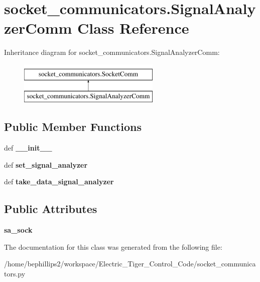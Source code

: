 \hypertarget{classsocket__communicators_1_1_signal_analyzer_comm}{\section{socket\-\_\-communicators.\-Signal\-Analyzer\-Comm Class Reference}
\label{classsocket__communicators_1_1_signal_analyzer_comm}
}
Inheritance diagram for socket\-\_\-communicators.\-Signal\-Analyzer\-Comm\-:\begin{figure}[H]
\begin{center}
\leavevmode
\includegraphics[height=2.000000cm]{classsocket__communicators_1_1_signal_analyzer_comm}
\end{center}
\end{figure}
\subsection*{Public Member Functions}
\begin{DoxyCompactItemize}
\item 
\hypertarget{classsocket__communicators_1_1_signal_analyzer_comm_a5e49fc639a0758b10017c0c4aeb9f905}{def {\bfseries \-\_\-\-\_\-init\-\_\-\-\_\-}}\label{classsocket__communicators_1_1_signal_analyzer_comm_a5e49fc639a0758b10017c0c4aeb9f905}

\item 
\hypertarget{classsocket__communicators_1_1_signal_analyzer_comm_a6126c357f3bed64a3504e52b79569ef2}{def {\bfseries set\-\_\-signal\-\_\-analyzer}}\label{classsocket__communicators_1_1_signal_analyzer_comm_a6126c357f3bed64a3504e52b79569ef2}

\item 
\hypertarget{classsocket__communicators_1_1_signal_analyzer_comm_a8320f6ea3a275618151f15f2416982e7}{def {\bfseries take\-\_\-data\-\_\-signal\-\_\-analyzer}}\label{classsocket__communicators_1_1_signal_analyzer_comm_a8320f6ea3a275618151f15f2416982e7}

\end{DoxyCompactItemize}
\subsection*{Public Attributes}
\begin{DoxyCompactItemize}
\item 
\hypertarget{classsocket__communicators_1_1_signal_analyzer_comm_ac389b2450afcf200f415d47659708763}{{\bfseries sa\-\_\-sock}}\label{classsocket__communicators_1_1_signal_analyzer_comm_ac389b2450afcf200f415d47659708763}

\end{DoxyCompactItemize}


The documentation for this class was generated from the following file\-:\begin{DoxyCompactItemize}
\item 
/home/bephillips2/workspace/\-Electric\-\_\-\-Tiger\-\_\-\-Control\-\_\-\-Code/socket\-\_\-communicators.\-py\end{DoxyCompactItemize}
